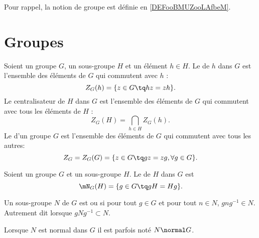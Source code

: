 
Pour rappel, la notion de groupe est définie en \ref{DEFooBMUZooLAfbeM}.

\section{Groupes}

\begin{definition}         \label{defGroupeCentre}
	Soient un groupe \( G\), un sous-groupe \( H\) et un élément \( h\in H\). Le  de \( h\) dans \( G\) est l'ensemble des éléments de \( G\) qui commutent avec \( h\) :
	\begin{equation}
		Z_G(h)=\{z\in G\tq hz=zh\}.
	\end{equation}
	Le centralisateur de \( H\) dans \( G\) est l'ensemble des éléments de \( G\) qui commutent avec tous les éléments de \( H\) :
	\begin{equation}
		Z_G(H)=\bigcap_{h\in H}Z_G(h).
	\end{equation}
	Le  d'un groupe \( G\) est l'ensemble des éléments de \( G\) qui commutent avec tous les autres:
	\begin{equation}
		Z_G=Z_G(G)=\{ z\in G\tq gz=zg , \forall g\in G \}.
	\end{equation}
\end{definition}

\begin{definition}          \label{DEFooZTSMooBislIy}
	Soient un groupe \( G\) et un sous-groupe \( H\). Le  de \( H\) dans \( G\) est
	\begin{equation}
		\mN_G(H)=\{ g\in G\tq gH=Hg \}.
	\end{equation}
\end{definition}

\begin{definition}                      \label{DEFooNIIMooFkZgvX}
	Un sous-groupe \( N\) de \( G\) est  ou  si pour tout \( g\in G\) et pour tout \( n\in N\), \( gng^{-1}\in N\). Autrement dit lorsque \( gNg^{-1}\subset N\).

	Lorsque \( N\) est normal dans \( G\) il est parfois noté \( N\normal G\).
\end{definition}


